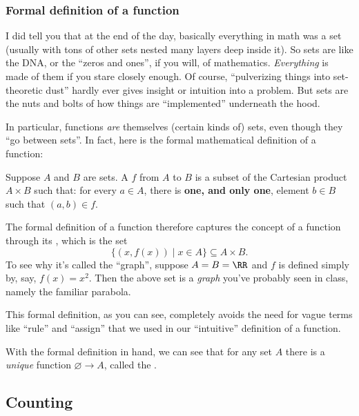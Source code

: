\subsubsection{Formal definition of a function}

I did tell you that at the end of the day, basically everything in math was a set (usually with tons of other sets nested many layers deep inside it). So sets are like the DNA, or the ``zeros and ones'', if you will, of mathematics. \emph{Everything} is made of them if you stare closely enough. Of course, ``pulverizing things into set-theoretic dust'' hardly ever gives insight or intuition into a problem. But sets are the nuts and bolts of how things are ``implemented'' underneath the hood.

In particular, functions \emph{are} themselves (certain kinds of) sets, even though they ``go between sets''. In fact, here is the formal mathematical definition of a function:

\begin{definition}
Suppose $A$ and $B$ are sets. A  $f$ from $A$ to $B$ is a subset of the Cartesian product $A \times B$ such that: for every $a \in A$, there is \textbf{one, and only one}, element $b \in B$ such that $(a,b) \in f$.
\end{definition}

The formal definition of a function therefore captures the concept of a function through its , which is the set
\[ \{ (x,f(x)) \mid x \in A \} \subseteq A \times B. \]
To see why it's called the ``graph'', suppose $A=B=\RR$ and $f$ is defined simply by, say, $f(x)=x^2$. Then the above set is a \emph{graph} you've probably seen in class, namely the familiar parabola. %

This formal definition, as you can see, completely avoids the need for vague terms like ``rule'' and ``assign'' that we used in our ``intuitive'' definition of a function.

\begin{example}
With the formal definition in hand, we can see that for any set $A$ there is a \emph{unique} function $\varnothing \to A$, called the .
\end{example}

\subsection{Counting}

